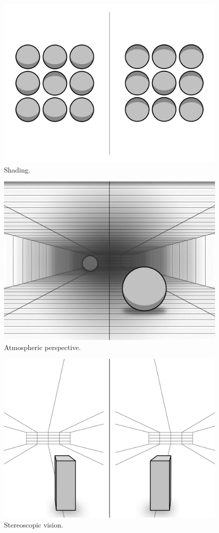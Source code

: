 \begin{figure}[H]
	\centering
	\includegraphics[width=1\linewidth]{figure/Analysis/shading.png}
	\caption{Shading.}
	\label{fig:shading}
\end{figure}

\begin{figure}[H]
	\centering
	\includegraphics[width=1\linewidth]{figure/Analysis/atmosphericPerspective.png}
	\caption{Atmospheric perspective.}
	\label{fig:atmosphericPerspective}
\end{figure}

\begin{figure}[H]
	\centering
	\includegraphics[width=1\linewidth]{figure/Analysis/stereoScopicVision.png}
	\caption{Stereoscopic vision.}
	\label{fig:stereoscopicVision}
\end{figure}
